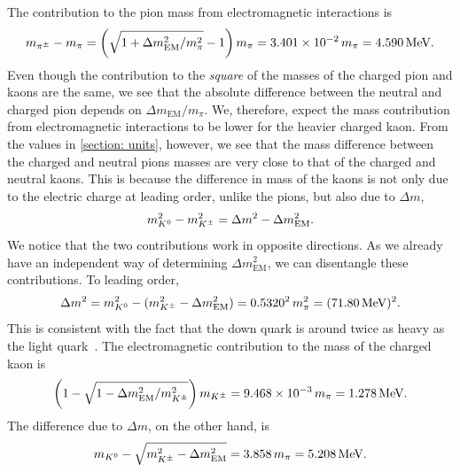 The contribution to the pion mass from electromagnetic interactions is
%
\begin{equation}
    m_{\pi^\pm} - m_\pi = \left(\sqrt{1 + \Delta m_\text{EM}^2 / m_\pi^2} - 1\right) m_\pi
    = 3.401\times 10^{-2} \,m_\pi = 4.590\,\text{MeV}.
\end{equation}
%
Even though the contribution to the \emph{square} of the masses of the charged pion and kaons are the same, we see that the absolute difference between the neutral and charged pion depends on $\Delta m_\text{EM}/ m_\pi $.
We, therefore, expect the mass contribution from electromagnetic interactions to be lower for the heavier charged kaon.
From the values in \autoref{section: units}, however, we see that the mass difference between the charged and neutral pions masses are very close to that of the charged and neutral kaons.
This is because the difference in mass of the kaons is not only due to the electric charge at leading order, unlike the pions, but also due to $\Delta m$,
%
\begin{equation}
    m_{K^0}^2 - m_{K^\pm}^2 = \Delta m^2 - \Delta m_\text{EM}^2.
\end{equation}
%
We notice that the two contributions work in opposite directions.
As we already have an independent way of determining $\Delta m_\text{EM}^2$, we can disentangle these contributions.
To leading order,
%
\begin{equation}
    \Delta m^2 
    = { m_{K^0}^2 - (m_{K^\pm}^2 - \Delta m^2_\text{EM})}
    = 0.5320^2 \, m_\pi^2 = (71.80\, \text{MeV})^2.
\end{equation}
%
This is consistent with the fact that the down quark is around twice as heavy as the light quark~\autocite{particledatagroupReviewParticlePhysics2020}.
The electromagnetic contribution to the mass of the charged kaon is
%
\begin{equation}
    \left(1 - \sqrt{1 - \Delta m_\text{EM}^2/m_{K^\pm}^2} \right) m_{K^\pm}
    = 9.468 \times 10^{-3} \, m_\pi = 1.278 \, \text{MeV}.
\end{equation}
%
The difference due to $\Delta m$, on the other hand, is
%
\begin{equation}
    m_{K^0} - \sqrt{m_{K^\pm}^2 - \Delta m_\text{EM}^2}
    = 3.858\,m_\pi = 5.208\, \text{MeV}.
\end{equation}


